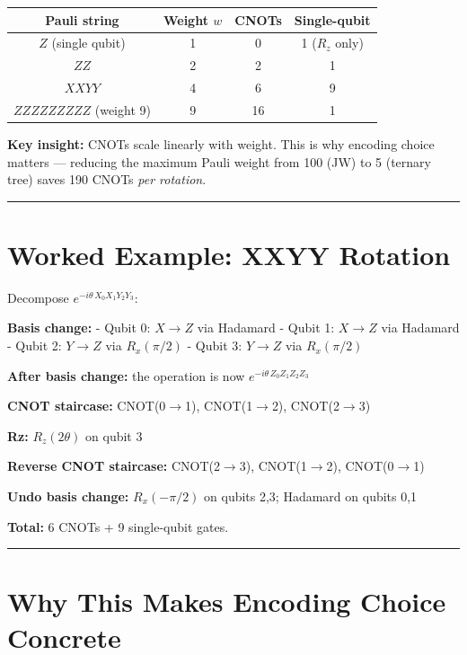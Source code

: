\documentclass[
  11pt,
  oneside]{book}
\begin{document}
\begin{longtable}[]{@{}cccc@{}}
\toprule\noalign{}
Pauli string & Weight \(w\) & CNOTs & Single-qubit \\
\midrule\noalign{}
\endhead
\bottomrule\noalign{}
\endlastfoot
\(Z\) (single qubit) & 1 & 0 & 1 (\(R_z\) only) \\
\(ZZ\) & 2 & 2 & 1 \\
\(XXYY\) & 4 & 6 & 9 \\
\(ZZZZZZZZZ\) (weight 9) & 9 & 16 & 1 \\
\end{longtable}

\textbf{Key insight:} CNOTs scale linearly with weight. This is why
encoding choice matters --- reducing the maximum Pauli weight from 100
(JW) to 5 (ternary tree) saves 190 CNOTs \emph{per rotation}.

\begin{center}\rule{0.5\linewidth}{0.5pt}\end{center}

\section{Worked Example: XXYY
Rotation}\label{worked-example-xxyy-rotation}

Decompose \(e^{-i\theta\, X_0 X_1 Y_2 Y_3}\):

\textbf{Basis change:} - Qubit 0: \(X \to Z\) via Hadamard - Qubit 1:
\(X \to Z\) via Hadamard - Qubit 2: \(Y \to Z\) via \(R_x(\pi/2)\) -
Qubit 3: \(Y \to Z\) via \(R_x(\pi/2)\)

\textbf{After basis change:} the operation is now
\(e^{-i\theta\, Z_0 Z_1 Z_2 Z_3}\)

\textbf{CNOT staircase:} CNOT(0$\rightarrow$1), CNOT(1$\rightarrow$2), CNOT(2$\rightarrow$3)

\textbf{Rz:} \(R_z(2\theta)\) on qubit 3

\textbf{Reverse CNOT staircase:} CNOT(2$\rightarrow$3), CNOT(1$\rightarrow$2), CNOT(0$\rightarrow$1)

\textbf{Undo basis change:} \(R_x(-\pi/2)\) on qubits 2,3; Hadamard on
qubits 0,1

\textbf{Total:} 6 CNOTs + 9 single-qubit gates.

\begin{center}\rule{0.5\linewidth}{0.5pt}\end{center}

\section{Why This Makes Encoding Choice
Concrete}\label{why-this-makes-encoding-choice-concrete}
\end{document}

